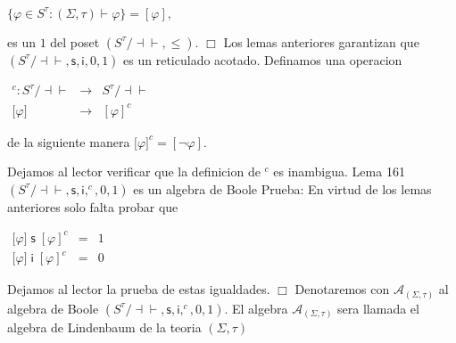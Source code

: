 \(\displaystyle \{\varphi \in S^{\tau }:(\Sigma ,\tau )\vdash \varphi \}=[\varphi ], \)

es un \(1\) del poset \((S^{\tau }/\mathrm{\dashv \vdash },\leq ).\) \(\Box\)
Los lemas anteriores garantizan que \((S^{\tau }/\mathrm{\dashv \vdash }, \mathsf{s},\mathsf{i},0,1)\) es un reticulado acotado. Definamos una operacion

\(\displaystyle \begin{array}{rcl} ^{c}:S^{\tau }/\mathrm{\dashv \vdash } & \rightarrow & S^{\tau }/\mathrm{ \dashv \vdash } \\ \lbrack \varphi ] & \rightarrow & [\varphi ]^{c} \end{array} \)

de la siguiente manera
\(\displaystyle \lbrack \varphi ]^{c}=[\lnot \varphi ]. \)

Dejamos al lector verificar que la definicion de \(^{c}\) es inambigua.
Lema 161 \((S^{\tau }/\mathrm{\dashv \vdash },\mathsf{s},\mathsf{i},^{c},0,1)\) es un algebra de Boole
Prueba: En virtud de los lemas anteriores solo falta probar que

\(\displaystyle \begin{array}{rcl} \lbrack \varphi ]\;\mathsf{s}\;[\varphi ]^{c} & =& 1 \\ \lbrack \varphi ]\;\mathsf{i}\;[\varphi ]^{c} & =& 0 \end{array} \)

Dejamos al lector la prueba de estas igualdades. \(\Box\)
Denotaremos con \(\mathcal{A}_{(\Sigma ,\tau )}\) al algebra de Boole \( (S^{\tau }/\mathrm{\dashv \vdash },\mathsf{s},\mathsf{i},^{c},0,1).\) El algebra \(\mathcal{A}_{(\Sigma ,\tau )}\) sera llamada el algebra de Lindenbaum de la teoria \((\Sigma ,\tau )\)

